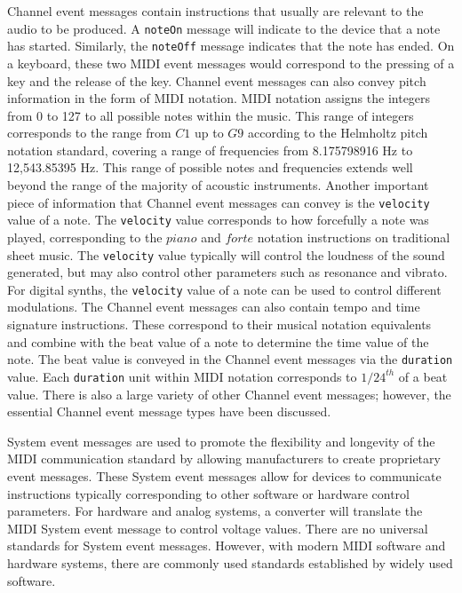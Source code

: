 \documentclass[a4paper,12pt]{report}
\begin{document}
Channel event messages contain instructions that usually are relevant to the audio to be produced. A \texttt{noteOn} message will indicate to the device that a note has started. Similarly, the \texttt{noteOff} message indicates that the note has ended. On a keyboard, these two MIDI event messages would correspond to the pressing of a key and the release of the key. Channel event messages can also convey pitch information in the form of MIDI notation. MIDI notation assigns the integers from 0 to 127 to all possible notes within the music. This range of integers corresponds to the range from $C1$ up to $G9$ according to the Helmholtz pitch notation standard, covering a range of frequencies from 8.175798916 Hz to 12,543.85395 Hz. This range of possible notes and frequencies extends well beyond the range of the majority of acoustic instruments. Another important piece of information that Channel event messages can convey is the \texttt{velocity} value of a note. The \texttt{velocity} value corresponds to how forcefully a note was played, corresponding to the $piano$ and $forte$ notation instructions on traditional sheet music. The \texttt{velocity} value typically will control the loudness of the sound generated, but may also control other parameters such as resonance and vibrato. For digital synths, the \texttt{velocity} value of a note can be used to control different modulations. The Channel event messages can also contain tempo and time signature instructions. These correspond to their musical notation equivalents and combine with the beat value of a note to determine the time value of the note. The beat value is conveyed in the Channel event messages via the \texttt{duration} value. Each \texttt{duration} unit within MIDI notation corresponds to $1/24^{th}$ of a beat value. There is also a large variety of other Channel event messages; however, the essential Channel event message types have been discussed.

System event messages are used to promote the flexibility and longevity of the MIDI communication standard by allowing manufacturers to create proprietary event messages. These System event messages allow for devices to communicate instructions typically corresponding to other software or hardware control parameters. For hardware and analog systems, a converter will translate the MIDI System event message to control voltage values. There are no universal standards for System event messages. However, with modern MIDI software and hardware systems, there are commonly used standards established by widely used software.
\end{document}
